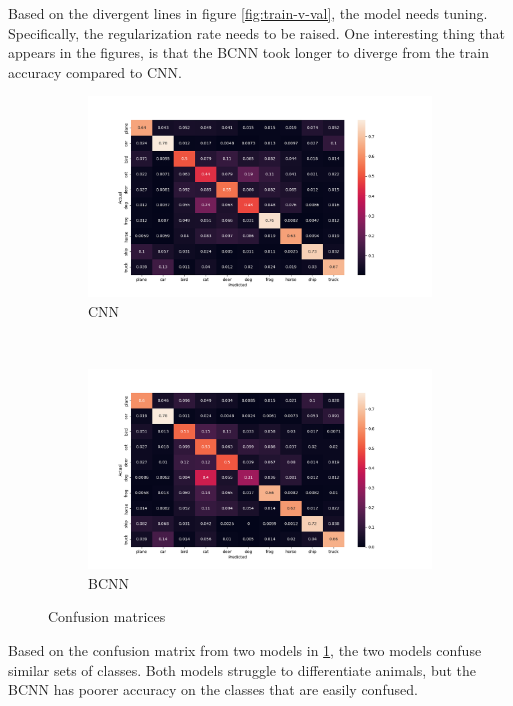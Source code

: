 \documentclass[12pt]{article}
\begin{document}
Based on the divergent lines in figure \ref{fig:train-v-val}, the model needs tuning. Specifically, the regularization rate needs to be raised. One interesting thing that appears in the figures, is that the BCNN took longer to diverge from the train accuracy compared to CNN.

\begin{figure}[H]
	\centering
	\begin{subfigure}{\textwidth}
		\centering
		\includegraphics[width=.9\linewidth]{../Images/CNN_confusion_matrix}
		\caption{CNN}
	\end{subfigure} \\%
	\begin{subfigure}{\textwidth}
		\centering
		\includegraphics[width=.9\linewidth]{../Images/BNN_confusion_matrix}
		\caption{BCNN}
	\end{subfigure}
	\caption{Confusion matrices}
	\label{fig:confusion}
\end{figure}

Based on the confusion matrix from two models in \ref{fig:confusion}, the two models confuse similar sets of classes. Both models struggle to differentiate animals, but the BCNN has poorer accuracy on the classes that are easily confused. 

\newpage

\printbibliography
\end{document}
